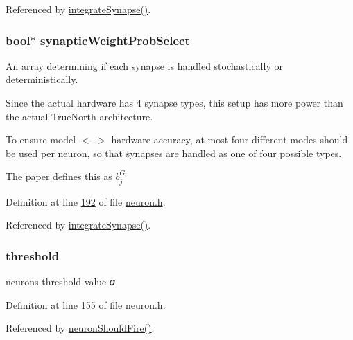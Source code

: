 Referenced by \hyperlink{neuron_8c_source_l00199}{integrate\+Synapse()}.

\hypertarget{structneuron_state_a4568f103808a436a62d7c7c47dc90e9b}{}
\subsubsection[{synaptic\+Weight\+Prob\+Select}]{\setlength{\rightskip}{0pt plus 5cm}bool$\ast$ synaptic\+Weight\+Prob\+Select}\label{structneuron_state_a4568f103808a436a62d7c7c47dc90e9b}


An array determining if each synapse is handled stochastically or deterministically. 

Since the actual hardware has 4 synapse types, this setup has more power than the actual True\+North architecture.

To ensure model $<$-\/$>$ hardware accuracy, at most four different modes should be used per neuron, so that synapses are handled as one of four possible types.

The paper defines this as $b_j^{G_i}$ 

Definition at line \hyperlink{neuron_8h_source_l00192}{192} of file \hyperlink{neuron_8h_source}{neuron.\+h}.



Referenced by \hyperlink{neuron_8c_source_l00199}{integrate\+Synapse()}.

\hypertarget{structneuron_state_a132470c4c17828c209e3403ccf7ee680}{}
\subsubsection[{threshold}]{ threshold}\label{structneuron_state_a132470c4c17828c209e3403ccf7ee680}


neuron\textquotesingle{}s threshold value 𝛼 



Definition at line \hyperlink{neuron_8h_source_l00155}{155} of file \hyperlink{neuron_8h_source}{neuron.\+h}.



Referenced by \hyperlink{neuron_8c_source_l00161}{neuron\+Should\+Fire()}.

